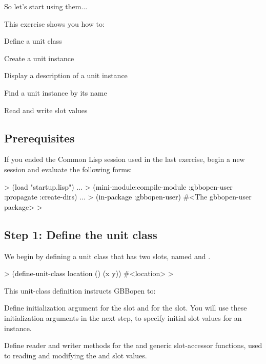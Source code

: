 \documentclass[10pt,twoside,english,pdftex]{article}
\begin{document}
So let's start using them$\ldots$

\fndocrule

This exercise shows you how to:
\begin{tightitemize}
\item Define a unit class
\item Create a unit instance
\item Display a description of a unit instance
\item Find a unit instance by its name
\item Read and write slot values
\end{tightitemize}

\fndocrule

\subsection*{Prerequisites}

%
%
If you ended the Common Lisp session used in the last exercise, begin a new
session and evaluate the following forms:
%
\begin{example}\color{darkergray}%
  > \textcolor{black}{(load "startup.lisp")}
     ...
  > \textcolor{black}{(mini-module:compile-module :gbbopen-user :propagate :create-dirs)}
     ...
  > \textcolor{black}{(in-package :gbbopen-user)}
  #<The gbbopen-user package>
  >
\end{example}

\subsection*{Step 1: Define the  unit class}

%
%
We begin by defining a unit class  that has two slots,
named  and .
%
\begin{example}\color{darkergray}%
  > \textcolor{black}{(define-unit-class location ()
      (x y))}
  #<location>
  >
\end{example}

This unit-class definition instructs GBBopen to:
%
\begin{tightitemize}
\item Define initialization argument  for the  slot
  and  for the  slot.  You will use these
  initialization arguments in the next step, to specify initial slot
  values for an instance.
\item Define reader and writer methods for the  and
   generic slot-accessor functions, used to reading
  and modifying the  and  slot values.
\end{tightitemize}
\end{document}
